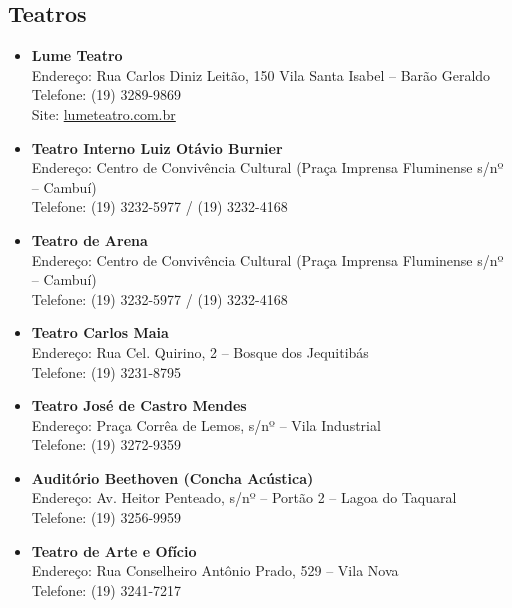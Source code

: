 \subsection{Teatros}

\begin{itemize}
    \item   \textbf{Lume Teatro}
        \\Endereço:  Rua Carlos Diniz Leitão, 150 Vila Santa Isabel -- Barão Geraldo
        \\Telefone: (19) 3289-9869
        \\Site: \url{lumeteatro.com.br}

    \item   \textbf{Teatro Interno Luiz Otávio Burnier}
        \\Endereço: Centro de Convivência Cultural (Praça Imprensa Fluminense s/nº -- Cambuí)
        \\Telefone: (19) 3232-5977 / (19) 3232-4168

    \item   \textbf{Teatro de Arena}
        \\Endereço: Centro de Convivência Cultural (Praça Imprensa Fluminense s/nº -- Cambuí)
        \\Telefone: (19) 3232-5977 / (19) 3232-4168

    \item   \textbf{Teatro Carlos Maia}
        \\Endereço: Rua Cel. Quirino, 2 -- Bosque dos Jequitibás
        \\Telefone: (19) 3231-8795

    \item   \textbf{Teatro José de Castro Mendes}
        \\Endereço: Praça Corrêa de Lemos, s/nº -- Vila Industrial
        \\Telefone: (19) 3272-9359

    \item   \textbf{Auditório Beethoven (Concha Acústica)}
        \\Endereço: Av. Heitor Penteado, s/nº -- Portão 2 -- Lagoa do Taquaral
        \\Telefone: (19) 3256-9959

    \item   \textbf{Teatro de Arte e Ofício}
        \\Endereço: Rua Conselheiro Antônio Prado, 529 -- Vila Nova
        \\Telefone: (19) 3241-7217


\end{itemize}
